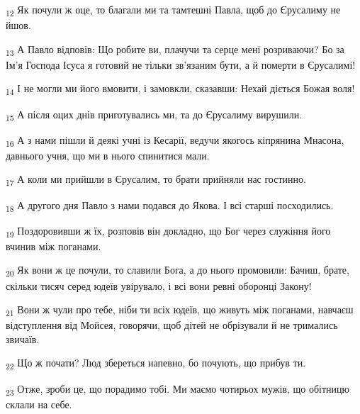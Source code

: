 \begin{tcolorbox}
\textsubscript{12} Як почули ж оце, то благали ми та тамтешні Павла, щоб до Єрусалиму не йшов.
\end{tcolorbox}
\begin{tcolorbox}
\textsubscript{13} А Павло відповів: Що робите ви, плачучи та серце мені розриваючи? Бо за Ім'я Господа Ісуса я готовий не тільки зв'язаним бути, а й померти в Єрусалимі!
\end{tcolorbox}
\begin{tcolorbox}
\textsubscript{14} І не могли ми його вмовити, і замовкли, сказавши: Нехай діється Божая воля!
\end{tcolorbox}
\begin{tcolorbox}
\textsubscript{15} А після оцих днів приготувались ми, та до Єрусалиму вирушили.
\end{tcolorbox}
\begin{tcolorbox}
\textsubscript{16} А з нами пішли й деякі учні із Кесарії, ведучи якогось кіпрянина Мнасона, давнього учня, що ми в нього спинитися мали.
\end{tcolorbox}
\begin{tcolorbox}
\textsubscript{17} А коли ми прийшли в Єрусалим, то брати прийняли нас гостинно.
\end{tcolorbox}
\begin{tcolorbox}
\textsubscript{18} А другого дня Павло з нами подався до Якова. І всі старші посходились.
\end{tcolorbox}
\begin{tcolorbox}
\textsubscript{19} Поздоровивши ж їх, розповів він докладно, що Бог через служіння його вчинив між поганами.
\end{tcolorbox}
\begin{tcolorbox}
\textsubscript{20} Як вони ж це почули, то славили Бога, а до нього промовили: Бачиш, брате, скільки тисяч серед юдеїв увірувало, і всі вони ревні оборонці Закону!
\end{tcolorbox}
\begin{tcolorbox}
\textsubscript{21} Вони ж чули про тебе, ніби ти всіх юдеїв, що живуть між поганами, навчаєш відступлення від Мойсея, говорячи, щоб дітей не обрізували й не тримались звичаїв.
\end{tcolorbox}
\begin{tcolorbox}
\textsubscript{22} Що ж почати? Люд збереться напевно, бо почують, що прибув ти.
\end{tcolorbox}
\begin{tcolorbox}
\textsubscript{23} Отже, зроби це, що порадимо тобі. Ми маємо чотирьох мужів, що обітницю склали на себе.
\end{tcolorbox}
